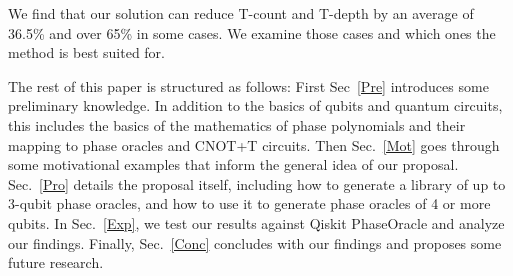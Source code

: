 We find that our solution can reduce T-count and T-depth by an average of 36.5\%
and over 65\% in some cases. We examine those cases and which ones the method
is best suited for.

The rest of this paper is structured as follows: First Sec~\ref{Pre}
introduces some preliminary knowledge. In addition to the basics of
qubits and quantum circuits, this includes the basics of the
mathematics of phase polynomials and their mapping to phase oracles
and CNOT+T circuits. Then Sec.~\ref{Mot} goes through some
motivational examples that inform the general idea of our proposal.
Sec.~\ref{Pro} details the proposal itself, including how to
generate a library of up to 3-qubit phase oracles, and how to use
it to generate phase oracles of 4 or more qubits. In Sec.~\ref{Exp},
we test our results against Qiskit PhaseOracle and analyze our
findings. Finally, Sec.~\ref{Conc} concludes with our findings and
proposes some future research.

